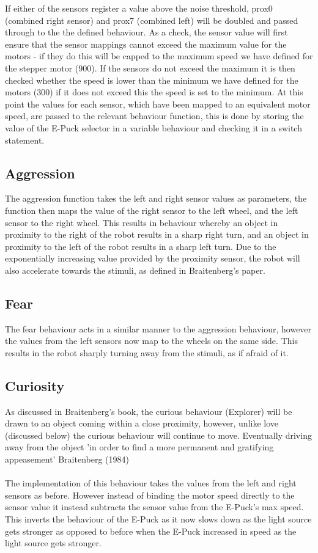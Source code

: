 \documentclass[11pt]{article}
\begin{document}
If either of the sensors register a value above the noise threshold, prox0 (combined right sensor) and prox7 (combined left) will be doubled and passed through to the the defined behaviour. As a check, the sensor value will first ensure that the sensor mappings cannot exceed the maximum value for the motors - if they do this will be capped to the maximum speed we have defined for the stepper motor (900). If the sensors do not exceed the maximum it is then checked whether the speed is lower than the minimum we have defined for the motors (300) if it does not exceed this the speed is set to the minimum. At this point the values for each sensor, which have been mapped to an equivalent motor speed, are passed to the relevant behaviour function, this is done by storing the value of the E-Puck selector in a variable behaviour and checking it in a switch statement.

\subsection*{Aggression}

The aggression function takes the left and right sensor values as parameters, the function then maps the value of the right sensor to the left wheel, and the left sensor to the right wheel. This results in behaviour whereby an object in proximity to the right of the robot results in a sharp right turn, and an object in proximity to the left of the robot results in a sharp left turn. Due to the exponentially increasing value provided by the proximity sensor, the robot will also accelerate towards the stimuli, as defined in Braitenberg's paper.

\subsection*{Fear}

The fear behaviour acts in a similar manner to the aggression behaviour, however the values from the left sensors now map to the wheels on the same side. This results in the robot sharply turning away from the stimuli, as if afraid of it.

\subsection*{Curiosity}

As discussed in Braitenberg's book, the curious behaviour (Explorer) will be drawn to an object coming within a close proximity, however, unlike love (discussed below) the curious behaviour will continue to move. Eventually driving away from the object 'in order to find a more permanent and gratifying appeasement' Braitenberg (1984)
\\
\\
The implementation of this behaviour takes the values from the left and right sensors as before. However instead of binding the motor speed directly to the sensor value it instead subtracts the sensor value from the E-Puck's max speed. This inverts the behaviour of the E-Puck as it now slows down as the light source gets stronger as opposed to before when the E-Puck increased in speed as the light source gets stronger.
\end{document}
